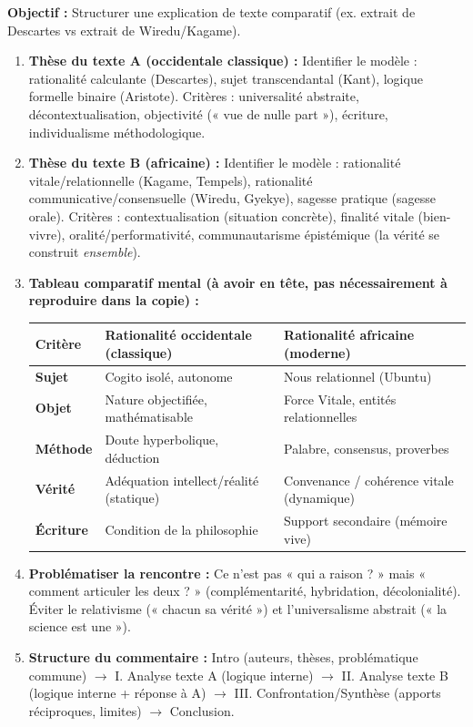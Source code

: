 \documentclass[11pt]{article}
\newcommand{\cle}[1]{{\popxbold\color{popdark}#1}}
\begin{document}
\begin{methode}
\textbf{Objectif :} Structurer une explication de texte comparatif (ex. extrait de Descartes vs extrait de Wiredu/Kagame).
\begin{enumerate}
    \item \textbf{Thèse du texte A (occidentale classique) :} Identifier le modèle : \cle{rationalité calculante} (Descartes), \cle{sujet transcendantal} (Kant), \cle{logique formelle binaire} (Aristote). Critères : universalité abstraite, décontextualisation, objectivité (« vue de nulle part »), écriture, individualisme méthodologique.
    \item \textbf{Thèse du texte B (africaine) :} Identifier le modèle : \cle{rationalité vitale/relationnelle} (Kagame, Tempels), \cle{rationalité communicative/consensuelle} (Wiredu, Gyekye), \cle{sagesse pratique} (sagesse orale). Critères : \cle{contextualisation} (situation concrète), \cle{finalité vitale} (bien-vivre), \cle{oralité/performativité}, \cle{communautarisme épistémique} (la vérité se construit \emph{ensemble}).
    \item \textbf{Tableau comparatif mental (à avoir en tête, pas nécessairement à reproduire dans la copie) :}
        \begin{center}
        \begin{tabular}{|l|l|l|}
        \hline
        \textbf{Critère} & \textbf{Rationalité occidentale (classique)} & \textbf{Rationalité africaine (moderne)} \\ \hline
        \textbf{Sujet} & \cle{Cogito} isolé, autonome & \cle{Nous} relationnel (Ubuntu) \\ \hline
        \textbf{Objet} & Nature objectifiée, mathématisable & \cle{Force Vitale}, entités relationnelles \\ \hline
        \textbf{Méthode} & Doute hyperbolique, déduction & \cle{Palabre}, consensus, proverbes \\ \hline
        \textbf{Vérité} & Adéquation intellect/réalité (statique) & \cle{Convenance} / cohérence vitale (dynamique) \\ \hline
        \textbf{Écriture} & Condition de la philosophie & Support secondaire (mémoire vive) \\ \hline
        \end{tabular}
        \end{center}
    \item \textbf{Problématiser la rencontre :} Ce n'est pas « qui a raison ? » mais « \cle{comment articuler les deux ?} » (complémentarité, hybridation, décolonialité). Éviter le relativisme (« chacun sa vérité ») et l'universalisme abstrait (« la science est une »).
    \item \textbf{Structure du commentaire :} Intro (auteurs, thèses, problématique commune) $\rightarrow$ I. Analyse texte A (logique interne) $\rightarrow$ II. Analyse texte B (logique interne + réponse à A) $\rightarrow$ III. Confrontation/Synthèse (apports réciproques, limites) $\rightarrow$ Conclusion.
\end{enumerate}
\end{methode}
\end{document}
